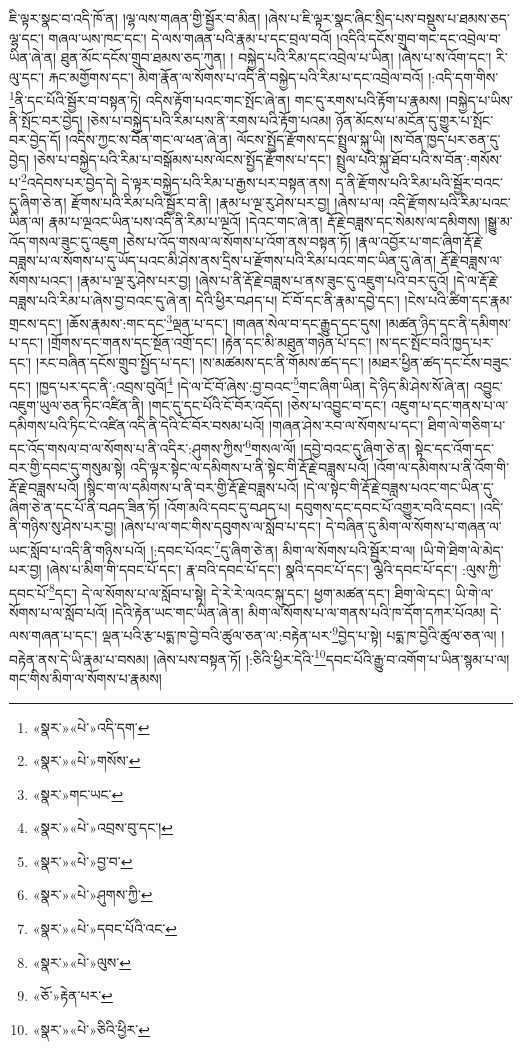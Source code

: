 ཇི་ལྟར་སྣང་བ་འདི་ཁོ་ན། །ལྷ་ལས་གཞན་གྱི་སྦྱོར་བ་མིན། །ཞེས་པ་ཇི་ལྟར་སྣང་ཞིང་སྲིད་པས་བསྡུས་པ་ཐམས་ཅད་ལྷ་དང་། གཞལ་ཡས་ཁང་དང་། དེ་ལས་གཞན་པའི་རྣམ་པ་དང་བྲལ་བའོ། །འདིའི་དངོས་གྲུབ་གང་དང་འབྲེལ་བ་ཡིན་ཞེ་ན། ཐུན་མོང་དངོས་གྲུབ་ཐམས་ཅད་ཀུན། །
བསྐྱེད་པའི་རིམ་དང་འབྲེལ་པ་ཡིན། །ཞེས་པ་ས་འོག་དང་། རི་ལུ་དང་། རྐང་མགྱོགས་དང་། མིག་རྣོན་ལ་སོགས་པ་འདི་ནི་བསྐྱེད་པའི་རིམ་པ་དང་འབྲེལ་བའོ། །:འདི་དག་གིས་\footnote{«སྣར་»«པེ་»འདི་དག་}ནི་དང་པོའི་སྦྱོར་བ་བསྟན་ཏེ། འདིས་རྟོག་པའང་གང་སྤོང་ཞེ་ན། གང་དུ་རགས་པའི་རྟོག་པ་རྣམས། །བསྐྱེད་པ་ཡིས་ནི་སྤོང་བར་བྱེད། །ཅེས་པ་བསྐྱེད་པའི་རིམ་པས་ནི་རགས་པའི་རྟོག་པའམ། ཉོན་མོངས་པ་མངོན་དུ་གྱུར་པ་སྤོང་བར་བྱེད་དོ། །འདིས་ཀྱང་ས་བོན་གང་ལ་ཕན་ཞེ་ན། ལོངས་སྤྱོད་རྫོགས་དང་སྤྲུལ་སྐུ་ཡི། །ས་བོན་ཁྱད་པར་ཅན་དུ་བྱེད། །ཅེས་པ་བསྐྱེད་པའི་རིམ་པ་བསྒོམས་པས་ལོངས་སྤྱོད་རྫོགས་པ་དང་། སྤྲུལ་པའི་སྐུ་ཐོབ་པའི་ས་བོན་:གསོས་པ་\footnote{«སྣར་»«པེ་»གསོས་}འདེབས་པར་བྱེད་དེ། དེ་ལྟར་བསྐྱེད་པའི་རིམ་པ་རྒྱས་པར་བསྟན་ནས། ད་ནི་རྫོགས་པའི་རིམ་པའི་སྦྱོར་བའང་དུ་ཞིག་ཅེ་ན། རྫོགས་པའི་རིམ་པའི་སྦྱོར་བ་ནི། །རྣམ་པ་ལྔ་རུ་ཤེས་པར་བྱ། །ཞེས་པ་ལ། འདི་རྫོགས་པའི་རིམ་པའང་ཡིན་ལ། རྣམ་པ་ལྔའང་ཡིན་པས་འདི་ནི་རིམ་པ་ལྔའོ། །དེའང་གང་ཞེ་ན། རྡོ་རྗེ་བཟླས་དང་སེམས་ལ་དམིགས། །སྒྱུ་མ་འོད་གསལ་ཟུང་དུ་འཇུག །ཅེས་པ་འོད་གསལ་ལ་སོགས་པ་འོག་ནས་བསྟན་ཏོ། །རྣལ་འབྱོར་པ་གང་ཞིག་རྡོ་རྗེ་བཟླས་པ་ལ་སོགས་པ་དུ་ཡོད་པའང་མི་ཤེས་ནས་དྲིས་པ་རྫོགས་པའི་རིམ་པའང་གང་ཡིན་དུ་ཞེ་ན། རྡོ་རྗེ་བཟླས་ལ་སོགས་པའང་། །རྣམ་པ་ལྔ་རུ་ཤེས་པར་བྱ། །ཞེས་པ་ནི་རྡོ་རྗེ་བཟླས་པ་ནས་ཟུང་དུ་འཇུག་པའི་བར་དུའོ། །དེ་ལ་རྡོ་རྗེ་བཟླས་པའི་རིམ་པ་ཞེས་བྱ་བའང་དུ་ཞེ་ན། དེའི་ཕྱིར་བཤད་པ། ངོ་བོ་དང་ནི་རྣམ་དབྱེ་དང་། །ངེས་པའི་ཚིག་དང་རྣམ་གྲངས་དང་། །ཆོས་རྣམས་:གང་དང་\footnote{«སྣར་»གང་ཡང་}ལྡན་པ་དང་། །གཞན་སེལ་བ་དང་རྒྱུད་དང་དུས། །མཚན་ཉིད་དང་ནི་དམིགས་པ་དང་། །གྲོགས་དང་གནས་དང་སྔོན་འགྲོ་དང་། །རྟེན་དང་མི་མཐུན་གཉེན་པོ་དང་། །ས་དང་སྤོང་བའི་ཁྱད་པར་དང་། །རང་བཞིན་དངོས་གྲུབ་སྤྱོད་པ་དང་། །ས་མཚམས་དང་ནི་གོམས་ཚད་དང་། །མཐར་ཕྱིན་ཚད་དང་ངོས་བཟུང་དང་། །ཁྱད་པར་དང་ནི་:འབྲས་བུའོ།\footnote{«སྣར་»«པེ་»འབྲས་བུ་དང་།} །དེ་ལ་ངོ་བོ་ཞེས་:བྱ་བའང་\footnote{«སྣར་»«པེ་»བྱ་བ་}གང་ཞིག་ཡིན། དེ་ཉིད་མི་ཤེས་སོ་ཞེ་ན། འབྱུང་འཇུག་ཡུལ་ཅན་ཏིང་འཛིན་ནི། །གང་དུ་དང་པོའི་ངོ་བོར་འདོད། །ཅེས་པ་འབྱུང་བ་དང་། འཇུག་པ་དང་གནས་པ་ལ་དམིགས་པའི་ཏིང་ངེ་འཛིན་འདི་ནི་དེའི་ངོ་བོར་བསམ་པའོ། །གཞན་ཤེས་རབ་ལ་སོགས་པ་དང་། ཐིག་ལེ་གཅིག་པ་དང་འོད་གསལ་བ་ལ་སོགས་པ་ནི་འདིར་:ཤུགས་ཀྱིས་\footnote{«སྣར་»«པེ་»ཤུགས་ཀྱི་}གསལ་ལོ། །དབྱེ་བའང་དུ་ཞིག་ཅེ་ན། སྟེང་དང་འོག་དང་བར་གྱི་དབང་དུ་གསུམ་སྟེ། འདི་ལྟར་སྟེང་ལ་དམིགས་པ་ནི་སྟེང་གི་རྡོ་རྗེ་བཟླས་པའོ། །འོག་ལ་དམིགས་པ་ནི་འོག་གི་རྡོ་རྗེ་བཟླས་པའོ། །སྙིང་ག་ལ་དམིགས་པ་ནི་བར་གྱི་རྡོ་རྗེ་བཟླས་པའོ། །དེ་ལ་སྟེང་གི་རྡོ་རྗེ་བཟླས་པའང་གང་ཡིན་དུ་ཞིག་ཅེ་ན་དང་པོ་ནི་བཤད་ཟིན་ཏོ། །འོག་མའི་དབང་དུ་བཤད་པ། དབུགས་དང་དབང་པོ་འགྱུར་བའི་དབང་། །འདི་ནི་གཉིས་སུ་ཤེས་པར་བྱ། །ཞེས་པ་ལ་གང་གིས་དབུགས་ལ་སློབ་པ་དང་། དེ་བཞིན་དུ་མིག་ལ་སོགས་པ་གཞན་ལ་ཡང་སློབ་པ་འདི་ནི་གཉིས་པའོ། །:དབང་པོའང་\footnote{«སྣར་»«པེ་»དབང་པོའི་འང་}དུ་ཞིག་ཅེ་ན། མིག་ལ་སོགས་པའི་སྦྱོར་བ་ལ། །ཡི་གེ་ཐིག་ལེ་མེད་པར་བྱ། །ཞེས་པ་མིག་གི་དབང་པོ་དང་། རྣ་བའི་དབང་པོ་དང་། སྣའི་དབང་པོ་དང་། ལྕེའི་དབང་པོ་དང་། :ལུས་ཀྱི་དབང་པོ་\footnote{«སྣར་»«པེ་»ལུས་}དང་། དེ་ལ་སོགས་པ་ལ་སློབ་པ་སྟེ། དེ་རེ་རེ་ལའང་སྐུ་དང་། ཕྱག་མཚན་དང་། ཐིག་ལེ་དང་། ཡི་གེ་ལ་སོགས་པ་ལ་སློབ་པའོ། །དེའི་རྟེན་ཡང་གང་ཡིན་ཞེ་ན། མིག་ལ་སོགས་པ་ལ་གནས་པའི་ཁ་དོག་དཀར་པོའམ། དེ་ལས་གཞན་པ་དང་། ལྡན་པའི་རྩ་པདྨ་ཁ་བྱེ་བའི་ཚུལ་ཅན་ལ་:བརྟེན་པར་\footnote{«ཅོ་»རྟེན་པར་}བྱེད་པ་སྟེ། པདྨ་ཁ་བྱེའི་ཚུལ་ཅན་ལ། །བརྟེན་ནས་དེ་ཡི་རྣམ་པ་བསམ། །ཞེས་པས་བསྟན་ཏོ། །:ཅིའི་ཕྱིར་དེའི་\footnote{«སྣར་»«པེ་»ཅིའི་ཕྱིར་}དབང་པོའི་རྒྱུ་བ་འགོག་པ་ཡིན་སྙམ་པ་ལ། གང་གིས་མིག་ལ་སོགས་པ་རྣམས། 